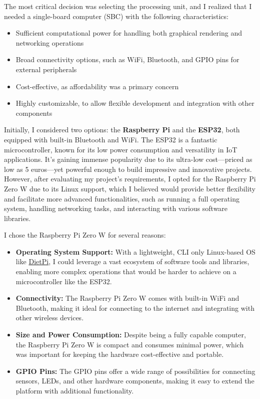 
The most critical decision was selecting the processing unit,
and I realized that I needed a single-board computer (SBC) with the following
characteristics:

\begin{itemize}
	\item Sufficient computational power for handling both graphical rendering and networking operations

	\item Broad connectivity options, such as WiFi, Bluetooth, and GPIO pins for
		external peripherals

	\item Cost-effective, as affordability was a primary concern

	\item Highly customizable, to allow flexible development and integration with
		other components
\end{itemize}

Initially, I considered two options: the \textbf{Raspberry Pi} and the \textbf{ESP32}, both
equipped with built-in Bluetooth and WiFi. The ESP32 is a fantastic microcontroller, known for its low power consumption and versatility in IoT applications. It's gaining immense popularity due to its ultra-low cost—priced as low as 5 euros—yet powerful enough to build impressive and innovative projects.
However,
after evaluating my project’s requirements, I opted for the Raspberry Pi Zero W due
to its Linux support, which I believed would provide better flexibility and
facilitate more advanced functionalities, such as running a full operating system,
handling networking tasks, and interacting with various software libraries.

I chose the Raspberry Pi Zero W for several reasons:
\begin{itemize}
	\item \textbf{Operating System Support:} With a lightweight, CLI only Linux-based OS like \href{https://dietpi.com/}{DietPi}, I could leverage a vast ecosystem of software tools and libraries,
		enabling more complex operations that would be harder to achieve on a
		microcontroller like the ESP32.

	\item \textbf{Connectivity:} The Raspberry Pi Zero W comes with built-in WiFi
		and Bluetooth, making it ideal for connecting to the internet and integrating
		with other wireless devices.

	\item \textbf{Size and Power Consumption:} Despite being a fully capable
		computer, the Raspberry Pi Zero W is compact and consumes minimal power,
		which was important for keeping the hardware cost-effective and portable.

	\item \textbf{GPIO Pins:} The GPIO pins offer a wide range of possibilities
		for connecting sensors, LEDs, and other hardware components, making it easy to
		extend the platform with additional functionality.
\end{itemize}